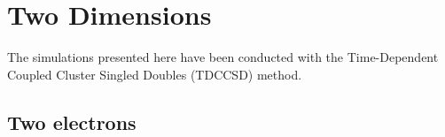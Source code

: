 \vfill
\pagebreak


\section{Two Dimensions}
\label{app:supp_2d_qd_results}

The simulations presented here have been conducted with the Time-Dependent Coupled 
Cluster Singled Doubles (TDCCSD) method.

\subsection*{Two electrons}

\begin{figure}[!h]
    \centering
\end{figure}
